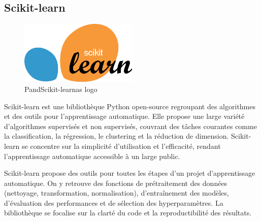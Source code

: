 \documentclass[a4paper,12pt]{report}
\numberwithin{equation}{section}
\begin{document}
\subsection{Scikit-learn}
\vspace{1cm}
\begin{figure}[H]
    \centering
    \includegraphics[width=0.5\textwidth]{tech/sklearn-logo.png}
    \caption{PandScikit-learnas logo}
    \label{fig:Scikit-learn logo}
\end{figure}
\vspace{1cm}
\par
Scikit-learn est une bibliothèque Python open-source regroupant des algorithmes et des outils pour l'apprentissage automatique. Elle propose une large variété d'algorithmes supervisés et non supervisés, couvrant des tâches courantes comme la classification, la régression, le clustering et la réduction de dimension. Scikit-learn se concentre sur la simplicité d'utilisation et l'efficacité, rendant l'apprentissage automatique accessible à un large public.
\\ \par 
Scikit-learn propose des outils pour toutes les étapes d'un projet d'apprentissage automatique. On y retrouve des fonctions de prétraitement des données (nettoyage, transformation, normalisation), d'entraînement des modèles, d'évaluation des performances et de sélection des hyperparamètres. La bibliothèque se focalise sur la clarté du code et la reproductibilité des résultats.
\end{document}
